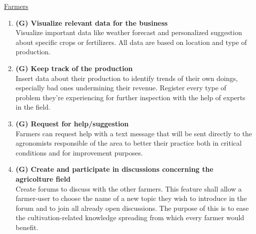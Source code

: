 \documentclass[table, 12pt]{article}
\begin{document}
\underline{Farmers}
\begin{enumerate}
    \item \textbf{(G) Visualize relevant data for the business}\\
    Visualize important data like weather forecast and personalized suggestion about specific crops or fertilizers.
    All data are based on location and type of production.
    \item \textbf{(G) Keep track of the production}\\
    Insert data about their production to identify trends of their own doings, especially bad ones undermining their revenue. Register every type of problem they're experiencing for further inspection with the help of experts in the field.
    \item \textbf{(G) Request for help/suggestion}\\
    Farmers can request help with a text message that will be sent directly to the agronomists responsible of the area to better their practice both in critical conditions and for improvement purposes. %
    \item \textbf{(G) Create and participate in discussions concerning the agricolture field}\\
    Create forums to discuss with the other farmers. This feature shall allow a farmer-user to choose the name of a new topic they wish to introduce in the forum and to join all already open discussions. The purpose of this is to ease the cultivation-related knowledge spreading from which every farmer would benefit.
\end{enumerate}
\end{document}
